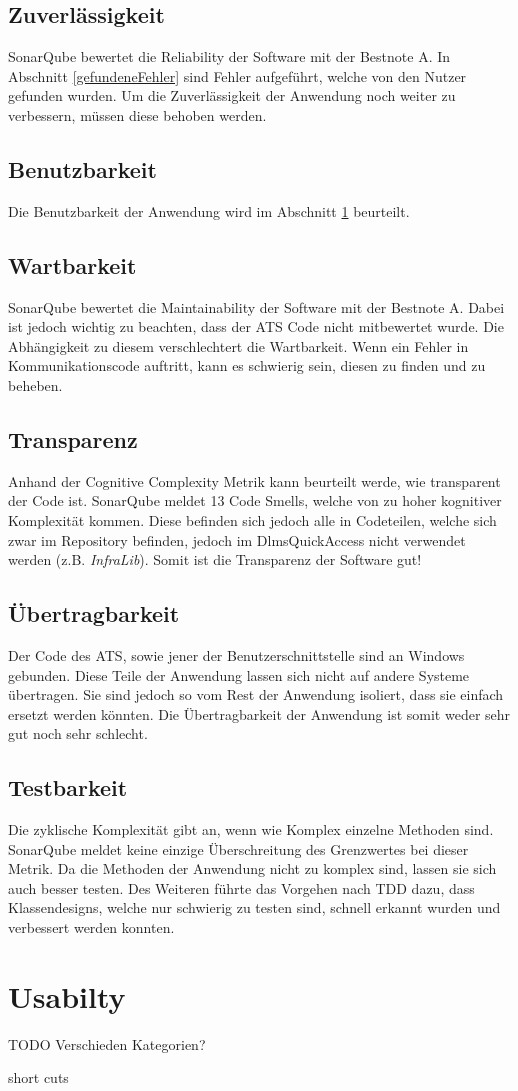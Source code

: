 \subsection{Zuverlässigkeit}
SonarQube bewertet die Reliability der Software mit der Bestnote \dq A\dq.
In Abschnitt \ref{gefundeneFehler} sind Fehler aufgeführt, welche von den Nutzer gefunden wurden.
Um die Zuverlässigkeit der Anwendung noch weiter zu verbessern, müssen diese behoben werden.

\subsection{Benutzbarkeit}
Die Benutzbarkeit der Anwendung wird im Abschnitt \ref{evalUsabilty} beurteilt.

\subsection{Wartbarkeit}
SonarQube bewertet die Maintainability der Software mit der Bestnote \dq A\dq.
Dabei ist jedoch wichtig zu beachten, dass der \ac{ATS} Code nicht mitbewertet wurde.
Die Abhängigkeit zu diesem verschlechtert die Wartbarkeit.
Wenn ein Fehler in Kommunikationscode auftritt, kann es schwierig sein, diesen zu finden und zu beheben.

\subsection{Transparenz}
Anhand der Cognitive Complexity Metrik kann beurteilt werde, wie transparent der Code ist.
SonarQube meldet 13 Code Smells, welche von zu hoher kognitiver Komplexität kommen.
Diese befinden sich jedoch alle in Codeteilen, welche sich zwar im Repository befinden, jedoch im DlmsQuickAccess nicht verwendet werden (z.B. \textit{InfraLib}).
Somit ist die Transparenz der Software gut!

\subsection{Übertragbarkeit}
Der Code des \ac{ATS}, sowie jener der Benutzerschnittstelle sind an Windows gebunden.
Diese Teile der Anwendung lassen sich nicht auf andere Systeme übertragen.
Sie sind jedoch so vom Rest der Anwendung isoliert, dass sie einfach ersetzt werden könnten.
Die Übertragbarkeit der Anwendung ist somit weder sehr gut noch sehr schlecht.

\subsection{Testbarkeit}
Die zyklische Komplexität gibt an, wenn wie Komplex einzelne Methoden sind.
SonarQube meldet keine einzige Überschreitung des Grenzwertes bei dieser Metrik.
Da die Methoden der Anwendung nicht zu komplex sind, lassen sie sich auch besser testen.
Des Weiteren führte das Vorgehen nach \ac{TDD} dazu, dass Klassendesigns, welche nur schwierig zu testen sind, schnell erkannt wurden und verbessert werden konnten.


\section{Usabilty}\label{evalUsabilty}
TODO
Verschieden Kategorien?

short cuts